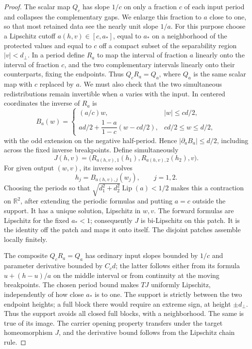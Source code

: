 \documentclass[11pt]{article}
\numberwithin{equation}{section}
\theoremstyle{definition}
\theoremstyle{remark}
\newcommand{\R}{\mathbb R}
\DeclareMathOperator{\Lip}{Lip}
\begin{document}
\begin{proof}
The scalar map $Q_c$ has slope $1/c$ on only a fraction $c$ of each
input period and collapses the complementary gaps.  We enlarge this
fraction to $a$ close to one, so that most retained data see the nearly
unit slope $1/a$.  For this purpose choose a Lipschitz cutoff
$a(h,v)\in[c,a_*]$, equal to $a_*$ on a
neighborhood of the protected values and equal to $c$ off a compact
subset of the separability region $|v|<d_\perp$.  In a period define
$R_a$ to map the interval of fraction $a$ linearly onto the interval of
fraction $c$, and the two complementary intervals linearly onto their
counterparts, fixing the endpoints.  Thus $Q_cR_a=Q_a$, where $Q_a$
is the same scalar map with $c$ replaced by $a$.
We must also check that the two simultaneous redistributions remain
invertible when $a$ varies with the input.  In centered coordinates
the inverse of $R_a$ is
\[
 B_a(w)=
 \begin{cases}
 (a/c)w,&|w|\leq cd/2,\\
 ad/2+\dfrac{1-a}{1-c}(w-cd/2),&cd/2\leq w\leq d/2,
 \end{cases}
\]
with the odd extension on the negative half-period.  Hence
$|\partial_a B_a|\leq d/2$, including across the fixed inverse
breakpoints.  Define simultaneously
\[
 J(h,v)=\bigl(R_{a(h,v),1}(h_1),R_{a(h,v),2}(h_2),v\bigr).
\]
For given output $(w,v)$, its inverse solves
\[
 h_j=B_{a(h,v),j}(w_j),\qquad j=1,2.
\]
Choosing the periods so that
$\sqrt{d_1^2+d_2^2}\Lip(a)<1/2$ makes this a contraction on $\R^2$,
after extending the periodic formulas and putting $a=c$ outside the
support.  It has a unique solution, Lipschitz in $w,v$.  The forward
formulas are Lipschitz for the fixed $a_*<1$; consequently $J$ is
bi-Lipschitz on this patch.  It is the identity off the patch and maps
it onto itself.  The disjoint patches assemble locally finitely.

The composite $Q_cR_a=Q_a$ has ordinary input slopes bounded
by $1/c$ and parameter derivative bounded by $C_cd$; the latter follows
either from its formula $u+(h-u)/a$ on the middle interval or from
continuity at the moving breakpoints.  The chosen period bound makes
$TJ$ uniformly Lipschitz, independently of how close $a_*$ is to one.
The support is strictly between the two endpoint heights; a full block
there would require an extreme sign, at height $\pm d_\perp$.
Thus the support avoids all closed full blocks, with a neighborhood.
The same is true of its image.  The carrier opening property transfers
under the target homeomorphism $J$, and the derivative bound follows
from the Lipschitz chain rule.


\end{proof}
\end{document}
